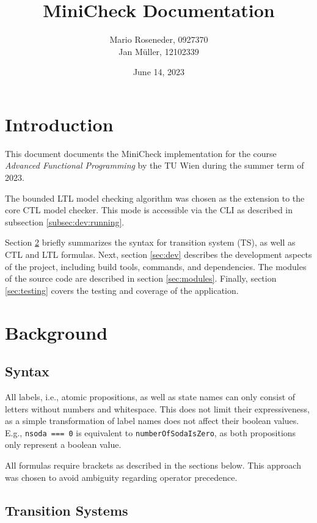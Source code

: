 \documentclass[11pt]{article}
\title{MiniCheck Documentation}
\author{Mario Roseneder, 0927370\\ Jan M\"uller, 12102339}
\date{June 14, 2023}
\begin{document}
\maketitle

\tableofcontents

\section{Introduction}

This document documents the MiniCheck implementation for the course \textit{Advanced Functional Programming} by the TU Wien during the summer term of 2023.

The bounded LTL model checking algorithm was chosen as the extension to the core CTL model checker.
This mode is accessible via the CLI as described in subsection \ref{subsec:dev:running}.

Section \ref{sec:background} briefly summarizes the syntax for transition system (TS), as well as CTL and LTL formulas.
Next, section \ref{sec:dev} describes the development aspects of the project, including build tools, commands, and dependencies.
The modules of the source code are described in section \ref{sec:modules}.
Finally, section \ref{sec:testing} covers the testing and coverage of the application.

\section{Background}
\label{sec:background}

\subsection{Syntax}

All labels, i.e., atomic propositions, as well as state names can only consist of letters without numbers and whitespace.
This does not limit their expressiveness, as a simple transformation of label names does not affect their boolean values.
E.g., \verb|nsoda === 0| is equivalent to \verb|numberOfSodaIsZero|, as both propositions only represent a boolean value.

All formulas require brackets as described in the sections below.
This approach was chosen to avoid ambiguity regarding operator precedence.

\subsection{Transition Systems}
\end{document}
